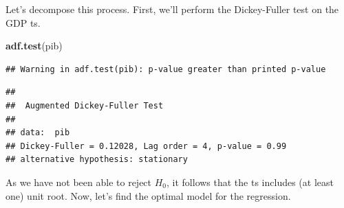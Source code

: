 \documentclass[
]{article}
\newenvironment{Shaded}{\begin{snugshade}}{\end{snugshade}}
\newcommand{\KeywordTok}[1]{\textcolor[rgb]{0.13,0.29,0.53}{\textbf{#1}}}
\newcommand{\NormalTok}[1]{#1}
\begin{document}
Let's decompose this process. First, we'll perform the Dickey-Fuller
test on the GDP ts.

\begin{Shaded}
\begin{Highlighting}[]
\KeywordTok{adf.test}\NormalTok{(pib)}
\end{Highlighting}
\end{Shaded}

\begin{verbatim}
## Warning in adf.test(pib): p-value greater than printed p-value
\end{verbatim}

\begin{verbatim}
## 
##  Augmented Dickey-Fuller Test
## 
## data:  pib
## Dickey-Fuller = 0.12028, Lag order = 4, p-value = 0.99
## alternative hypothesis: stationary
\end{verbatim}

As we have not been able to reject \(H_0\), it follows that the ts
includes (at least one) unit root. Now, let's find the optimal model for
the regression.
\end{document}
